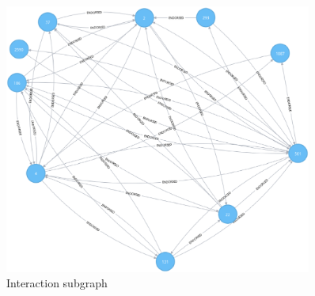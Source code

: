 \begin{figure}[h]
	\includegraphics[width=0.9\textwidth]{Images/graph_Node561.eps}
	\caption{Interaction subgraph} 
	\label{subgraph}
\end{figure}















